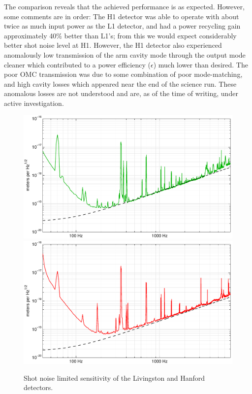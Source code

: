 The comparison reveals that the achieved performance is as expected.  However,
some comments are in order: The H1 detector was able to operate with about twice
as much input power as the L1 detector, and had a power recycling gain
approximately 40\% better than L1's; from this we would expect considerably
better shot noise level at H1.  However, the H1 detector also experienced
anomalously low transmission of the arm cavity mode through the output mode
cleaner which contributed to a power efficiency ($\epsilon$) much lower than
desired.  The poor OMC transmission was due to some combination of poor
mode-matching, and high cavity losses which appeared near the end of the science
run.  These anomalous losses are not understood and are, as of the time of
writing, under active investigation.  

\begin{figure}
\includegraphics[width=\columnwidth]{figures/L1-965543700-thesis.pdf}
\includegraphics[width=\columnwidth]{figures/H1-962268780-thesis.pdf}
\caption[Shot noise sensitivity limit (measured and expected)]{\label{fig:shot-noise-limited-sensitivity}Shot noise limited sensitivity of the Livingston and Hanford detectors.}
\end{figure}



